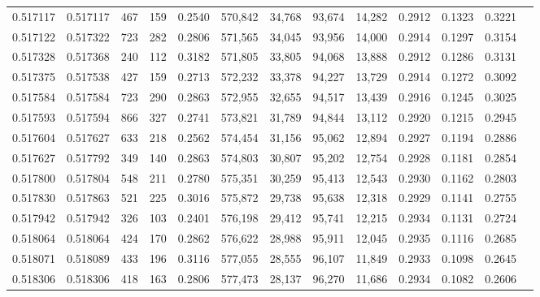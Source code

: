 \begin{tabular}{rrrrrrrrrrrrr}
0.517117 & 0.517117 &   467 &   159 &                                     0.2540 & 570,842 &  34,768 &  93,674 &  14,282 & 0.2912 & 0.1323 & 0.3221 \\
0.517122 & 0.517322 &   723 &   282 &                                     0.2806 & 571,565 &  34,045 &  93,956 &  14,000 & 0.2914 & 0.1297 & 0.3154 \\
0.517328 & 0.517368 &   240 &   112 &                                     0.3182 & 571,805 &  33,805 &  94,068 &  13,888 & 0.2912 & 0.1286 & 0.3131 \\
0.517375 & 0.517538 &   427 &   159 &                                     0.2713 & 572,232 &  33,378 &  94,227 &  13,729 & 0.2914 & 0.1272 & 0.3092 \\
0.517584 & 0.517584 &   723 &   290 &                                     0.2863 & 572,955 &  32,655 &  94,517 &  13,439 & 0.2916 & 0.1245 & 0.3025 \\
0.517593 & 0.517594 &   866 &   327 &                                     0.2741 & 573,821 &  31,789 &  94,844 &  13,112 & 0.2920 & 0.1215 & 0.2945 \\
0.517604 & 0.517627 &   633 &   218 &                                     0.2562 & 574,454 &  31,156 &  95,062 &  12,894 & 0.2927 & 0.1194 & 0.2886 \\
0.517627 & 0.517792 &   349 &   140 &                                     0.2863 & 574,803 &  30,807 &  95,202 &  12,754 & 0.2928 & 0.1181 & 0.2854 \\
0.517800 & 0.517804 &   548 &   211 &                                     0.2780 & 575,351 &  30,259 &  95,413 &  12,543 & 0.2930 & 0.1162 & 0.2803 \\
0.517830 & 0.517863 &   521 &   225 &                                     0.3016 & 575,872 &  29,738 &  95,638 &  12,318 & 0.2929 & 0.1141 & 0.2755 \\
0.517942 & 0.517942 &   326 &   103 &                                     0.2401 & 576,198 &  29,412 &  95,741 &  12,215 & 0.2934 & 0.1131 & 0.2724 \\
0.518064 & 0.518064 &   424 &   170 &                                     0.2862 & 576,622 &  28,988 &  95,911 &  12,045 & 0.2935 & 0.1116 & 0.2685 \\
0.518071 & 0.518089 &   433 &   196 &                                     0.3116 & 577,055 &  28,555 &  96,107 &  11,849 & 0.2933 & 0.1098 & 0.2645 \\
0.518306 & 0.518306 &   418 &   163 &                                     0.2806 & 577,473 &  28,137 &  96,270 &  11,686 & 0.2934 & 0.1082 & 0.2606 \\

\end{tabular}
